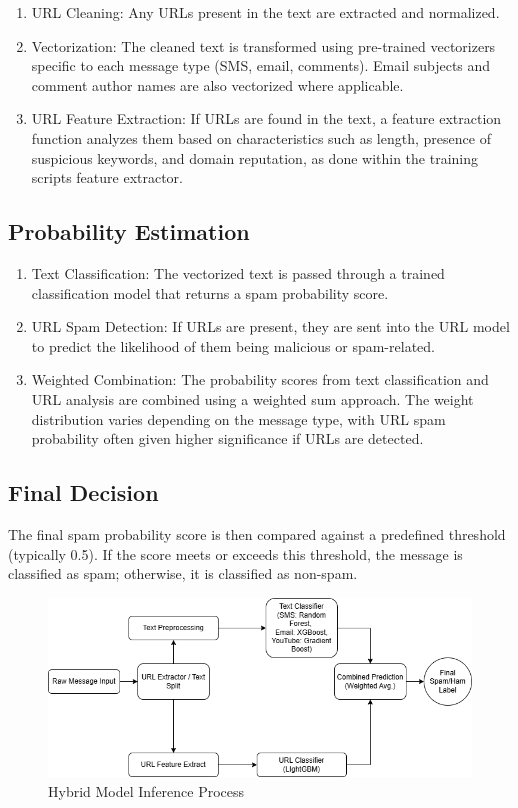 \documentclass{article}
\begin{document}
\begin{enumerate}
    \item URL Cleaning: Any URLs present in the text are extracted and normalized.
    \item Vectorization: The cleaned text is transformed using pre-trained vectorizers specific to each message type (SMS, email, comments). Email subjects and comment author names are also vectorized where applicable.
    \item URL Feature Extraction: If URLs are found in the text, a feature extraction function analyzes them based on characteristics such as length, presence of suspicious keywords, and domain reputation, as done within the training scripts feature extractor.
\end{enumerate}

\subsection{Probability Estimation}

\begin{enumerate}
    \item Text Classification: The vectorized text is passed through a trained classification model that returns a spam probability score.
    \item URL Spam Detection: If URLs are present, they are sent into the URL model to predict the likelihood of them being malicious or spam-related.
    \item Weighted Combination: The probability scores from text classification and URL analysis are combined using a weighted sum approach. The weight distribution varies depending on the message type, with URL spam probability often given higher significance if URLs are detected.
\end{enumerate}

\subsection{Final Decision}

The final spam probability score is then compared against a predefined threshold (typically 0.5). If the score meets or exceeds this threshold, the message is classified as spam; otherwise, it is classified as non-spam.
\newline

\begin{figure}[htbp]
    \centering
    \includegraphics[width=1.0\textwidth]{../analysis/Model_Pipeline_Full_Flowchart.png}
    \caption{Hybrid Model Inference Process}
    \label{fig:inference_process}
\end{figure}
\end{document}

